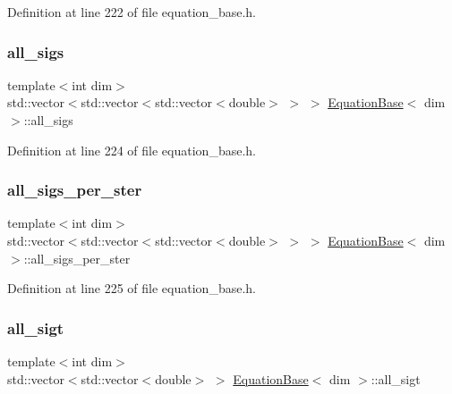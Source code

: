 Definition at line 222 of file equation\+\_\+base.\+h.

\mbox{\label{class_equation_base_a6775388f6b8dcd903a0f95443b2e8c0d}} 
\subsubsection{\texorpdfstring{all\+\_\+sigs}{all\_sigs}}
{\footnotesize\ttfamily template$<$int dim$>$ \\
std\+::vector$<$std\+::vector$<$std\+::vector$<$double$>$ $>$ $>$ \hyperlink{class_equation_base}{Equation\+Base}$<$ dim $>$\+::all\+\_\+sigs\hspace{0.3cm}{\ttfamily [protected]}}



Definition at line 224 of file equation\+\_\+base.\+h.

\mbox{\label{class_equation_base_abf2c1a575944b0661bb48e2380c269a0}} 
\subsubsection{\texorpdfstring{all\+\_\+sigs\+\_\+per\+\_\+ster}{all\_sigs\_per\_ster}}
{\footnotesize\ttfamily template$<$int dim$>$ \\
std\+::vector$<$std\+::vector$<$std\+::vector$<$double$>$ $>$ $>$ \hyperlink{class_equation_base}{Equation\+Base}$<$ dim $>$\+::all\+\_\+sigs\+\_\+per\+\_\+ster\hspace{0.3cm}{\ttfamily [protected]}}



Definition at line 225 of file equation\+\_\+base.\+h.

\mbox{\label{class_equation_base_a818488c38892b44ccf25eb6f61e89ecc}} 
\subsubsection{\texorpdfstring{all\+\_\+sigt}{all\_sigt}}
{\footnotesize\ttfamily template$<$int dim$>$ \\
std\+::vector$<$std\+::vector$<$double$>$ $>$ \hyperlink{class_equation_base}{Equation\+Base}$<$ dim $>$\+::all\+\_\+sigt\hspace{0.3cm}{\ttfamily [protected]}}




